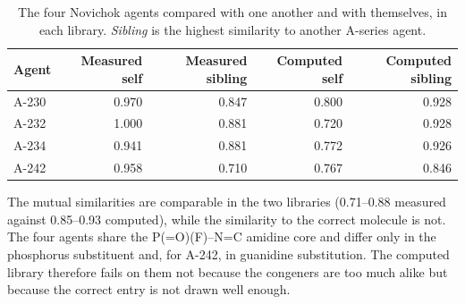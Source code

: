 \begin{table}[htbp]
\centering
\caption{The four Novichok agents compared with one another and with themselves, in each library. \emph{Sibling} is the highest similarity to another A-series agent.}
\label{tab:si-nov}
\small
\begin{tabular}{lrrrr}
\toprule
Agent & Measured self & Measured sibling & Computed self & Computed sibling \\
\midrule
A-230 & 0.970 & 0.847 & 0.800 & 0.928 \\
A-232 & 1.000 & 0.881 & 0.720 & 0.928 \\
A-234 & 0.941 & 0.881 & 0.772 & 0.926 \\
A-242 & 0.958 & 0.710 & 0.767 & 0.846 \\
\bottomrule
\end{tabular}

\begin{flushleft}\footnotesize The mutual similarities are comparable in the two libraries (0.71--0.88 measured against 0.85--0.93 computed), while the similarity to the correct molecule is not. The four agents share the P(=O)(F)--N=C amidine core and differ only in the phosphorus substituent and, for A-242, in guanidine substitution. The computed library therefore fails on them not because the congeners are too much alike but because the correct entry is not drawn well enough.\end{flushleft}
\end{table}
